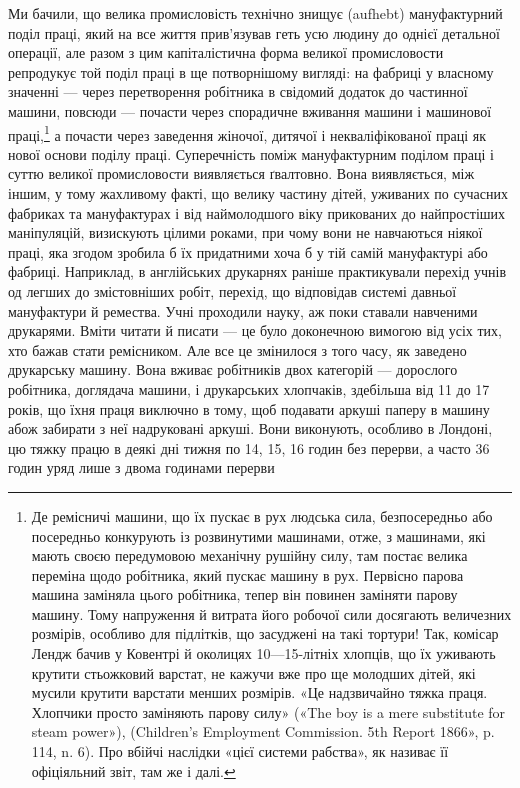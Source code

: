 Ми бачили, що велика промисловість технічно знищує (aufhebt)
мануфактурний поділ праці, який на все життя прив’язував
геть усю людину до однієї детальної операції, але разом з цим
капіталістична форма великої промисловости репродукує той
поділ праці в ще потворнішому вигляді: на фабриці у власному
значенні — через перетворення робітника в свідомий додаток
до частинної машини, повсюди — почасти через спорадичне вживання
машини і машинової праці,\footnote{
Де ремісничі машини, що їх пускає в рух людська сила, безпосередньо
або посередньо конкурують із розвинутими машинами, отже, з
машинами, які мають своєю передумовою механічну рушійну силу, там
постає велика переміна щодо робітника, який пускає машину в рух.
Первісно парова машина заміняла цього робітника, тепер він повинен
заміняти парову машину. Тому напруження й витрата його робочої сили
досягають величезних розмірів, особливо для підлітків, що засуджені
на такі тортури! Так, комісар Лендж бачив у Ковентрі й околицях 10—15-літніх
хлопців, що їх уживають крутити стьожковий варстат, не
кажучи вже про ще молодших дітей, які мусили крутити варстати менших
розмірів. «Це надзвичайно тяжка праця. Хлопчики просто заміняють
парову силу» («The boy is a mere substitute for steam power»),
(Children’s Employment Commission. 5th Report 1866», p. 114, n. 6). Про
вбійчі наслідки «цієї системи рабства», як називає її офіціяльний звіт,
там же і далі.
} а почасти через заведення
жіночої, дитячої і некваліфікованої праці як нової основи поділу
праці. Суперечність поміж мануфактурним поділом праці і суттю
великої промисловости виявляється ґвалтовно. Вона виявляється,
між іншим, у тому жахливому факті, що велику частину дітей,
уживаних по сучасних фабриках та мануфактурах і від наймолодшого
віку прикованих до найпростіших маніпуляцій, визискують
цілими роками, при чому вони не навчаються ніякої праці, яка
згодом зробила б їх придатними хоча б у тій самій мануфактурі
або фабриці. Наприклад, в англійських друкарнях раніше практикували
перехід учнів од легших до змістовніших робіт, перехід,
що відповідав системі давньої мануфактури й ремества. Учні
проходили науку, аж поки ставали навченими друкарями. Вміти
читати й писати — це було доконечною вимогою від усіх тих,
хто бажав стати ремісником. Але все це змінилося з того часу,
як заведено друкарську машину. Вона вживає робітників двох
категорій — дорослого робітника, доглядача машини, і друкарських
хлопчаків, здебільша від 11 до 17 років, що їхня праця
виключно в тому, щоб подавати аркуші паперу в машину абож
забирати з неї надруковані аркуші. Вони виконують, особливо
в Лондоні, цю тяжку працю в деякі дні тижня по 14, 15, 16 годин
без перерви, а часто 36 годин уряд лише з двома годинами перерви
\parbreak{}  %
